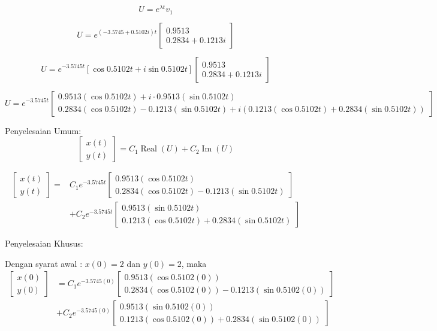 \documentclass{article}
\begin{document}
\begin{enumerate}
\begin{enumerate}[label=\alph*.]
    \[
    U = e^{\lambda t} v_1
    \]
    
    \[
    U = e^{(-3.5745 + 0.5102i)t} \begin{bmatrix} 0.9513 \\ 0.2834 + 0.1213i \end{bmatrix}
    \]
    
    \[
    U = e^{-3.5745t} \left[ \cos 0.5102t + i \sin 0.5102t \right] \begin{bmatrix} 0.9513 \\ 0.2834 + 0.1213i \end{bmatrix}
    \]
    
    \[
    U = e^{-3.5745t} \begin{bmatrix} 0.9513 (\cos 0.5102t) + i \cdot 0.9513 (\sin 0.5102t) \\ 0.2834 (\cos 0.5102t) - 0.1213 (\sin 0.5102t) + i (0.1213 (\cos 0.5102t) + 0.2834 (\sin 0.5102t)) \end{bmatrix}
    \]

    Penyelesaian Umum:
    \[
    \begin{bmatrix} x(t) \\ y(t) \end{bmatrix} = C_1 \operatorname{Real}(U) + C_2 \operatorname{Im}(U)
    \]
    
    \begin{align*}
        \begin{bmatrix} x(t) \\ y(t) \end{bmatrix} =& C_1e^{-3.5745t} \begin{bmatrix} 0.9513 (\cos 0.5102t) \\ 0.2834 (\cos 0.5102t) - 0.1213 (\sin 0.5102t) \end{bmatrix} \\
        &+ C_2 e^{-3.5745t}\begin{bmatrix} 0.9513 (\sin 0.5102t) \\ 0.1213 (\cos 0.5102t) + 0.2834 (\sin 0.5102t) \end{bmatrix} 
    \end{align*}

    Penyelesaian Khusus:

    Dengan syarat awal : \( x(0) = 2 \) dan \( y(0) = 2 \), maka
    \begin{align*}
        \begin{bmatrix} x(0) \\ y(0) \end{bmatrix} &= C_1 e^{-3.5745(0)} \begin{bmatrix} 0.9513 (\cos 0.5102(0)) \\ 0.2834 (\cos 0.5102(0)) - 0.1213 (\sin 0.5102(0)) \end{bmatrix} \\
        &+ C_2 e^{-3.5745(0)} \begin{bmatrix} 0.9513 (\sin 0.5102(0)) \\ 0.1213 (\cos 0.5102(0)) + 0.2834 (\sin 0.5102(0)) \end{bmatrix}
    \end{align*}


\end{enumerate}
\end{enumerate}
\end{document}
